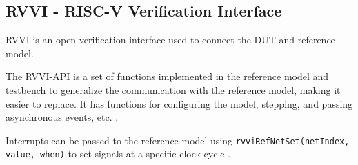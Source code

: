 \subsection{RVVI - RISC-V Verification Interface}
\label{sec:rvvi}

RVVI is an open verification interface used to connect the DUT and reference model. 

The RVVI-API is a set of functions implemented in the reference model and testbench to generalize the communication with the reference model, making it easier to replace. It has functions for configuring the model, stepping, and passing asynchronous events, etc. \cite{riscv-verificationRISCVVerificationInterface2023}.

Interrupts can be passed to the reference model using \lstinline{rvviRefNetSet(netIndex, value, when)} to set signals at a specific clock cycle \cite{riscv-verificationRISCVVerificationInterface2023}.



%
%




